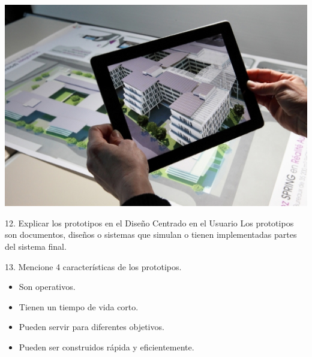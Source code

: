 \documentclass{beamer}
\begin{document}
\begin{frame}
\begin{center} 
 \includegraphics[scale = 0.4]{7_3.jpg}
\end{center}

\end{frame}


\begin{frame}
\begin{block}{12. Explicar los prototipos en el Diseño Centrado en el Usuario}
Los prototipos son documentos, diseños o sistemas que simulan o tienen implementadas partes del sistema final.
\end{block}
\begin{block}{13. Mencione 4 características de los prototipos.}
\begin{itemize}
    \item Son operativos.
    \item Tienen un tiempo de vida corto.
    \item Pueden servir para diferentes objetivos.
    \item Pueden ser construidos rápida y eficientemente.
\end{itemize}
\end{block}
\end{frame}
\end{document}
